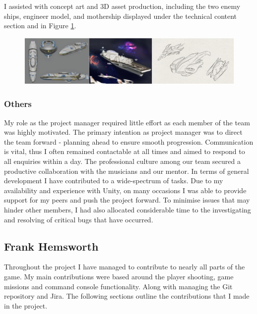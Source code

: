 \documentclass[a4paper,11pt]{article}
\begin{document}
I assisted with concept art and 3D asset production, including the two enemy ships, engineer model, and mothership displayed under the technical content section and in Figure \ref{fig:conceptart}.

\begin{figure}[ht]
	\centering
	\includegraphics[scale = 0.8]{images/dillon_assets}
    \label{fig:conceptart}
\end{figure}

\subsubsection{Others}

My role as the project manager required little effort as each member of the team was highly motivated. The primary intention as project manager was to direct the team forward - planning ahead to ensure smooth progression. Communication is vital, thus I often remained contactable at all times and aimed to respond to all enquiries within a day. The professional culture among our team secured a productive collaboration with the musicians and our mentor. In terms of general development I have contributed to a wide-spectrum of tasks. Due to my availability and experience with Unity, on many occasions I was able to provide support for my peers and push the project forward. To minimise issues that may hinder other members, I had also allocated considerable time to the investigating and resolving of critical bugs that have occurred.

\clearpage

\subsection{Frank Hemsworth}
Throughout the project I have managed to contribute to nearly all parts of the game. My main contributions were based around the player shooting, game missions and command console functionality. Along with managing the Git repository and Jira. The following sections outline the contributions that I made in the project.
\end{document}
